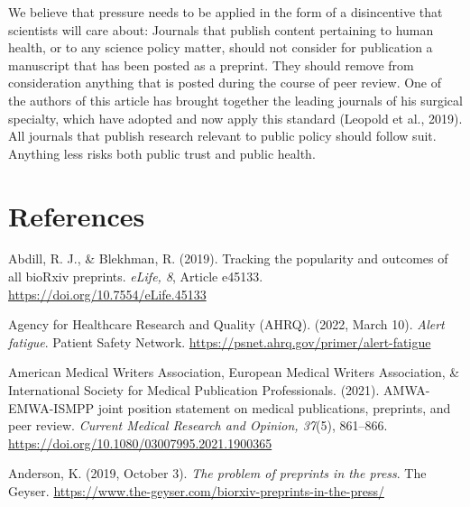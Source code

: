 \documentclass[authordate, perspective, issue]{jote-new-article}
\begin{document}
	We believe that pressure needs to be applied in the form of a disincentive that scientists will care about: Journals that publish content pertaining to human health, or to any science policy matter, should not consider for publication a manuscript that has been posted as a preprint. They should remove from consideration anything that is posted during the course of peer review. One of the authors of this article has brought together the leading journals of his surgical specialty, which have adopted and now apply this standard (Leopold et al., 2019). All journals that publish research relevant to public policy should follow suit. Anything less risks both public trust and public health.











	\section{References}







	Abdill, R. J., \& Blekhman, R. (2019). Tracking the popularity and outcomes of all bioRxiv preprints. \emph{eLife, 8}, Article e45133. \url{https://doi.org/10.7554/eLife.45133}







	Agency for Healthcare Research and Quality (AHRQ). (2022, March 10). \emph{Alert fatigue}. Patient Safety Network. \url{https://psnet.ahrq.gov/primer/alert-fatigue}







	American Medical Writers Association, European Medical Writers Association, \& International Society for Medical Publication Professionals. (2021). AMWA-EMWA-ISMPP joint position statement on medical publications, preprints, and peer review. \emph{Current Medical Research and Opinion, 37}(5), 861--866. \url{https://doi.org/10.1080/03007995.2021.1900365}







	Anderson, K. (2019, October 3). \emph{The problem of preprints in the press}. The Geyser. \url{https://www.the-geyser.com/biorxiv-preprints-in-the-press/}
\end{document}
